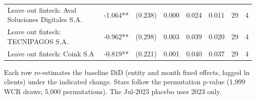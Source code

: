 \begin{table}[!htbp]
{\begin{tabular}{lrrrrrrr}
Leave out fintech: Aval Soluciones Digitales S.A. & -1.064** & (0.238) & 0.000 & 0.024 & 0.011 & 29 & 4 \\
Leave out fintech: TECNIPAGOS S.A. & -0.962** & (0.298) & 0.003 & 0.039 & 0.020 & 29 & 4 \\
Leave out fintech: Coink S.A & -0.819** & (0.221) & 0.001 & 0.040 & 0.037 & 29 & 4 \\
\bottomrule
\end{tabular}
}
\par\vspace{2pt}\parbox{\textwidth}{\footnotesize Each row re-estimates the baseline DiD (entity and month fixed effects, lagged ln clients) under the indicated change. Stars follow the permutation p-value (1,999 WCR draws; 5,000 permutations). The Jul-2023 placebo uses 2023 only.}
\end{table}